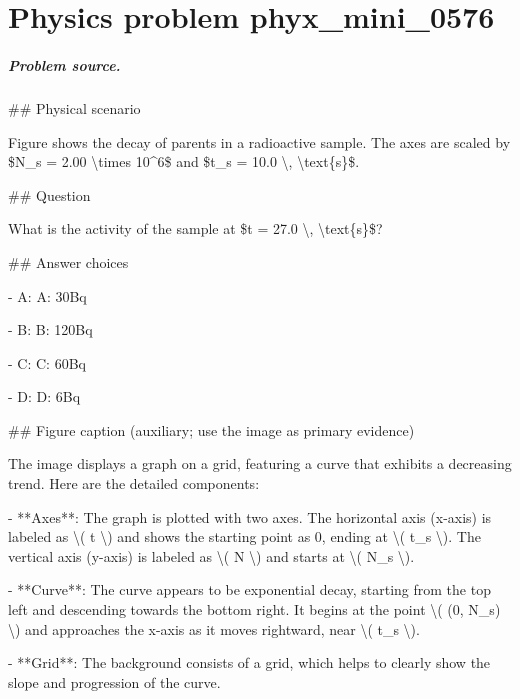 
\chapter{Physics problem phyx\_mini\_0576}
\label{ch:PhyXMiniProblems_problem_phyx_mini_0576}

\paragraph{Problem source.}
\#\# Physical scenario

Figure shows the decay of parents in a radioactive sample. The axes are scaled by \$N\_s = 2.00 \textbackslash{}times 10\textasciicircum{}6\$ and \$t\_s = 10.0 \textbackslash{}, \textbackslash{}text\{s\}\$.

\#\# Question

What is the activity of the sample at \$t = 27.0 \textbackslash{}, \textbackslash{}text\{s\}\$?

\#\# Answer choices

- A: A: 30Bq

- B: B: 120Bq

- C: C: 60Bq

- D: D: 6Bq

\#\# Figure caption (auxiliary; use the image as primary evidence)

The image displays a graph on a grid, featuring a curve that exhibits a decreasing trend. Here are the detailed components:

- **Axes**: The graph is plotted with two axes. The horizontal axis (x-axis) is labeled as \textbackslash{}( t \textbackslash{}) and shows the starting point as 0, ending at \textbackslash{}( t\_s \textbackslash{}). The vertical axis (y-axis) is labeled as \textbackslash{}( N \textbackslash{}) and starts at \textbackslash{}( N\_s \textbackslash{}).

- **Curve**: The curve appears to be exponential decay, starting from the top left and descending towards the bottom right. It begins at the point \textbackslash{}( (0, N\_s) \textbackslash{}) and approaches the x-axis as it moves rightward, near \textbackslash{}( t\_s \textbackslash{}).

- **Grid**: The background consists of a grid, which helps to clearly show the slope and progression of the curve.

